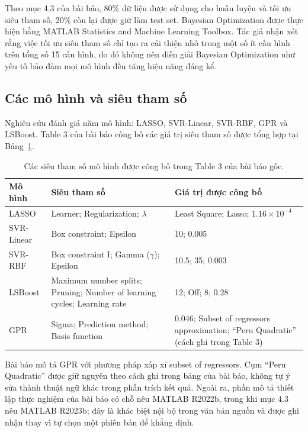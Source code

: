 Theo mục 4.3 của bài báo, 80\% dữ liệu được sử dụng cho huấn luyện và tối ưu siêu tham số, 20\% còn lại được giữ làm test set. Bayesian Optimization được thực hiện bằng MATLAB Statistics and Machine Learning Toolbox. Tác giả nhận xét rằng việc tối ưu siêu tham số chỉ tạo ra cải thiện nhỏ trong một số ít cấu hình trên tổng số 15 cấu hình, do đó không nên diễn giải Bayesian Optimization như yếu tố bảo đảm mọi mô hình đều tăng hiệu năng đáng kể.

\subsection{Các mô hình và siêu tham số}

Nghiên cứu đánh giá năm mô hình: LASSO, SVR-Linear, SVR-RBF, GPR và LSBoost. Table 3 của bài báo công bố các giá trị siêu tham số được tổng hợp tại Bảng~\ref{tab:authors-model-hyperparameters}.

\begin{table}[H]
\centering
\small
\caption{Các siêu tham số mô hình được công bố trong Table 3 của bài báo gốc.}
\label{tab:authors-model-hyperparameters}
\begin{tabular}{p{2.6cm}p{5.0cm}p{5.2cm}}
\toprule
\textbf{Mô hình} & \textbf{Siêu tham số} & \textbf{Giá trị được công bố} \\
\midrule
LASSO & Learner; Regularization; $\lambda$ & Least Square; Lasso; $1.16\times10^{-4}$ \\
SVR-Linear & Box constraint; Epsilon & 10; 0.005 \\
SVR-RBF & Box constraint I; Gamma ($\gamma$); Epsilon & 10.5; 35; 0.003 \\
LSBoost & Maximum number splits; Pruning; Number of learning cycles; Learning rate & 12; Off; 8; 0.28 \\
GPR & Sigma; Prediction method; Basis function & 0.046; Subset of regressors approximation; ``Peru Quadratic'' (cách ghi trong Table 3) \\
\bottomrule
\end{tabular}
\end{table}

Bài báo mô tả GPR với phương pháp xấp xỉ subset of regressors. Cụm ``Peru Quadratic'' được giữ nguyên theo cách ghi trong bảng của bài báo, không tự ý sửa thành thuật ngữ khác trong phần trích kết quả. Ngoài ra, phần mô tả thiết lập thực nghiệm của bài báo có chỗ nêu MATLAB R2022b, trong khi mục 4.3 nêu MATLAB R2023b; đây là khác biệt nội bộ trong văn bản nguồn và được ghi nhận thay vì tự chọn một phiên bản để khẳng định.

